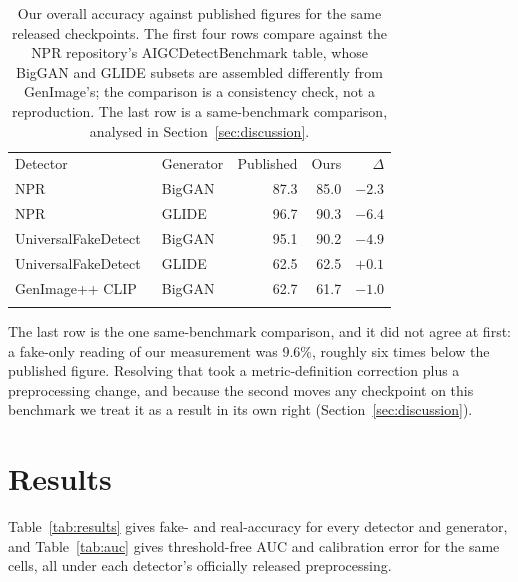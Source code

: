 \documentclass[3p,times,procedia]{elsarticle}
\begin{document}
\begin{table}[h]
\caption{Our overall accuracy against published figures for the same
released checkpoints. The first four rows compare against the NPR
repository's AIGCDetectBenchmark table, whose BigGAN and GLIDE subsets are
assembled differently from GenImage's; the comparison is a consistency
check, not a reproduction. The last row is a same-benchmark comparison,
analysed in Section~\ref{sec:discussion}.}
\label{tab:published}
\begin{tabular*}{\hsize}{@{\extracolsep{\fill}}llrrr@{}}
\toprule
Detector & Generator & Published & Ours & $\Delta$ \\
\colrule
NPR~\cite{tan2024npr} & BigGAN & 87.3 & 85.0 & $-2.3$ \\
NPR~\cite{tan2024npr} & GLIDE & 96.7 & 90.3 & $-6.4$ \\
UniversalFakeDetect~\cite{ojha2023universal} & BigGAN & 95.1 & 90.2 & $-4.9$ \\
UniversalFakeDetect~\cite{ojha2023universal} & GLIDE & 62.5 & 62.5 & $+0.1$ \\
GenImage++ CLIP~\cite{zhou2025omat} & BigGAN & 62.7 & 61.7 & $-1.0$ \\
\botrule
\end{tabular*}
\end{table}

The last row is the one same-benchmark comparison, and it did not agree at
first: a fake-only reading of our measurement was 9.6\%, roughly six times
below the published figure. Resolving that took a metric-definition
correction plus a preprocessing change, and because the second moves any
checkpoint on this benchmark we treat it as a result in its own right
(Section~\ref{sec:discussion}).

\section{Results}
\label{sec:results}

Table~\ref{tab:results} gives fake- and real-accuracy for every detector
and generator, and Table~\ref{tab:auc} gives threshold-free AUC and
calibration error for the same cells, all under each detector's officially
released preprocessing.
\end{document}
